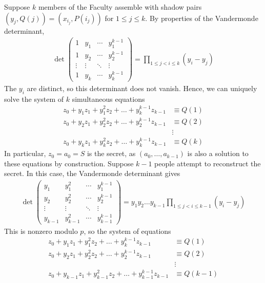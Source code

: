 Suppose $k$ members of the Faculty assemble with shadow pairs $(y_j, Q(j)) = (x_{i_j}, P(i_j))$ for $1 \leq j \leq k$.
By properties of the Vandermonde determinant,
\begin{align*}
    \det\begin{pmatrix}
    1 & y_1 & \cdots & y_1^{k-1} \\
    1 & y_2 & \cdots & y_2^{k-1} \\
    \vdots & \vdots & \ddots & \vdots \\
    1 & y_k & \cdots & y_k^{k-1}
    \end{pmatrix} = \prod_{1 \leq j < i \leq k} (y_i - y_j)
\end{align*}
The $y_i$ are distinct, so this determinant does not vanish.
Hence, we can uniquely solve the system of $k$ simultaneous equations
\begin{align*}
    z_0 + y_1 z_1 + y_1^2 z_2 + \dots + y_k^{k-1} z_{k-1} &\equiv Q(1) \\
    z_0 + y_2 z_1 + y_2^2 z_2 + \dots + y_2^{k-1} z_{k-1} &\equiv Q(2) \\
    &\vdots \\
    z_0 + y_k z_1 + y_k^2 z_2 + \dots + y_k^{k-1} z_{k-1} &\equiv Q(k)
\end{align*}
In particular, $z_0 = a_0 = S$ is the secret, as $(a_0, \dots, a_{k-1})$ is also a solution to these equations by construction.
Suppose $k-1$ people attempt to reconstruct the secret.
In this case, the Vandermonde determinant gives
\begin{align*}
    \det\begin{pmatrix}
    y_1 & y_1^2 & \cdots & y_1^{k-1} \\
    y_2 & y_2^2 & \cdots & y_2^{k-1} \\
    \vdots & \vdots & \ddots & \vdots \\
    y_{k-1} & y_{k-1}^2 & \cdots & y_{k-1}^{k-1}
    \end{pmatrix} = y_1 y_2 \dots y_{k-1} \prod_{1 \leq j < i \leq k-1} (y_i - y_j)
\end{align*}
This is nonzero modulo $p$, so the system of equations
\begin{align*}
    z_0 + y_1 z_1 + y_1^2 z_2 + \dots + y_k^{k-1} z_{k-1} &\equiv Q(1) \\
    z_0 + y_2 z_1 + y_2^2 z_2 + \dots + y_2^{k-1} z_{k-1} &\equiv Q(2) \\
    &\vdots \\
    z_0 + y_{k-1} z_1 + y_{k-1}^2 z_2 + \dots + y_{k-1}^{k-1} z_{k-1} &\equiv Q(k-1)
\end{align*}
